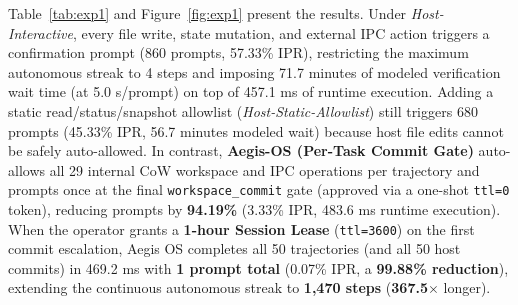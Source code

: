 \documentclass[acmsmall,screen,review]{acmart}
\begin{document}
Table~\ref{tab:exp1} and Figure~\ref{fig:exp1} present the results. Under \emph{Host-Interactive}, every file write, state mutation, and external IPC action triggers a confirmation prompt (860 prompts, 57.33\% IPR), restricting the maximum autonomous streak to 4 steps and imposing 71.7 minutes of modeled verification wait time (at 5.0 s/prompt) on top of 457.1 ms of runtime execution. Adding a static read/status/snapshot allowlist (\emph{Host-Static-Allowlist}) still triggers 680 prompts (45.33\% IPR, 56.7 minutes modeled wait) because host file edits cannot be safely auto-allowed. In contrast, \textbf{Aegis-OS (Per-Task Commit Gate)} auto-allows all 29 internal CoW workspace and IPC operations per trajectory and prompts once at the final \texttt{workspace\_commit} gate (approved via a one-shot \texttt{ttl=0} token), reducing prompts by \textbf{94.19\%} (3.33\% IPR, 483.6 ms runtime execution). When the operator grants a \textbf{1-hour Session Lease} (\texttt{ttl=3600}) on the first commit escalation, Aegis OS completes all 50 trajectories (and all 50 host commits) in 469.2 ms with \textbf{1 prompt total} (0.07\% IPR, a \textbf{99.88\% reduction}), extending the continuous autonomous streak to \textbf{1,470 steps} (\textbf{367.5$\times$} longer).
\end{document}
